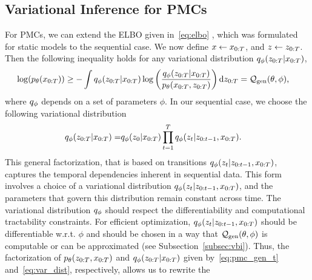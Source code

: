 \subsection{Variational Inference for PMCs}
For PMCs, we can extend the ELBO given in~\eqref{eq:elbo} ,
which was formulated for static models to the sequential case.
We now define $x
\leftarrow x_{0:T}$, and $z \leftarrow z_{0:T}$.
Then the following inequality holds for any variational distribution 
$q_\phi(z_{0:T}|x_{0:T})$,
\begin{align}
    \label{eq:elbo_general}
    \log(p_{\theta}(x_{0:T})) & \geq - \int  q_\phi(z_{0:T}|x_{0:T})
    \log  \left(\frac{q_\phi(z_{0:T}|x_{0:T})}{p_{\theta}(x_{0:T},z_{0:T})}\right) 
     {\rm d} z_{0:T}  = \mathcal{Q}_{\mathrm{gen}}(\theta,\phi) \text{,}
\end{align}
where  $q_\phi$ depends on a set of parameters $\phi$.
In our sequential case, we choose the following variational distribution
\begin{align}
    \label{eq:var_dist}
    q_\phi(z_{0:T}|x_{0:T})=& q_\phi(z_{0}|x_{0:T}) 
    \prod_{t=1}^T q_\phi(z_{t}|z_{0:t-1},x_{0:T}) \text{.} 
\end{align}
This general factorization, that is based on transitions 
$q_\phi(z_{t}|z_{0:t-1},x_{0:T})$, captures 
the temporal dependencies inherent in sequential data.
This form involves a choice of a variational distribution
$q_\phi(z_{t}|z_{0:t-1},x_{0:T})$,
and the parameters that govern this distribution remain constant across
time. %
The variational distribution $q_\phi$ should respect the differentiability 
and computational tractability constraints.
For efficient optimization, $q_\phi(z_{t}|z_{0:t-1},x_{0:T})$ should
be differentiable w.r.t. $\phi$ and 
should be chosen in a way that $\mathcal{Q}_{\mathrm{gen}}(\theta,\phi)$ is computable or can be
approximated (see Subsection~\ref{subsec:vbi}).
Thus, the factorization of $p_{\theta}(z_{0:T},x_{0:T})$ and 
$q_\phi(z_{0:T}|x_{0:T})$  given by~\eqref{eq:pmc_gen_t}
and~\eqref{eq:var_dist}, respectively, allows us to rewrite the 
